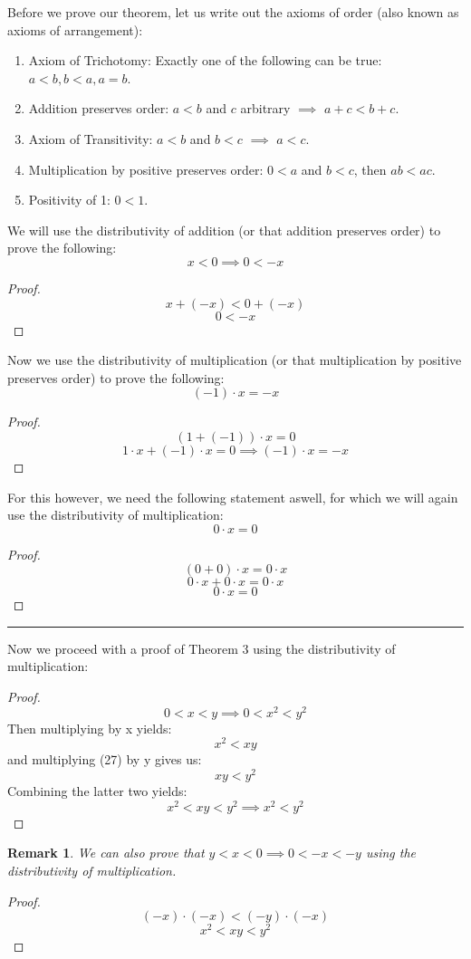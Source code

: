 \documentclass{article}
\newtheorem*{remark}{Remark}
\begin{document}
Before we prove our theorem, let us write out the axioms of order (also known as axioms of arrangement):
\begin{enumerate}
    \item Axiom of Trichotomy: Exactly one of the following can be true: $a < b, b < a, a = b$.
    \item Addition preserves order: $a < b$ and $c$ arbitrary $\implies$ $a + c < b + c$.
    \item  Axiom of Transitivity: $a < b$ and $b < c$ $\implies$ $a < c$.
    \item Multiplication by positive preserves order: $0 < a$ and $b < c$, then $ab < ac$.
    \item Positivity of 1: $0 < 1$.
\end{enumerate}
We will use the distributivity of addition (or that addition preserves order) to prove the following:
\[
    x < 0 \implies 0 < -x
\]
\begin{proof}
\[
    x + (-x) < 0 + (-x)
\]
\[
    0 < -x
\]
\end{proof}
Now we use the distributivity of multiplication (or that multiplication by positive preserves order) to prove the following:
\[
    (-1)\cdot x = -x
\]
\begin{proof}
\[
    (1 + (-1)) \cdot x = 0
\]
\[
    1 \cdot x + (-1) \cdot x = 0 \implies (-1) \cdot x = -x
\]
\end{proof}
For this however, we need the following statement aswell, for which we will again use the distributivity of multiplication:
\[
    0\cdot x = 0
\]
\begin{proof}
\[
    (0+0) \cdot x = 0 \cdot x
\]
\[
    0 \cdot x + 0 \cdot x = 0 \cdot x
\]
\[
    0 \cdot x = 0
\]
\end{proof}

\hrule
\vspace{1em}

Now we proceed with a proof of Theorem 3 using the distributivity of multiplication:

\begin{proof}
    \begin{equation}
    0 < x < y \implies 0 < x^2 < y^2
    \end{equation}
    Then multiplying by x yields:
    \[
    x^2 < xy
    \]
    and multiplying (27) by y gives us:
    \[
    xy < y^2
    \]
    Combining the latter two yields:
    \[
    x^2 < xy < y^2 \implies x^2 < y^2
    \]
\end{proof}

\begin{remark}
    We can also prove that $y < x < 0 \implies 0 < -x < -y$ using the distributivity of multiplication.
\end{remark}

\begin{proof}
    \[
    (-x) \cdot (-x) < (-y) \cdot (-x)
    \]
    \[
    x^2 < xy < y^2
    \]
\end{proof}
\end{document}
